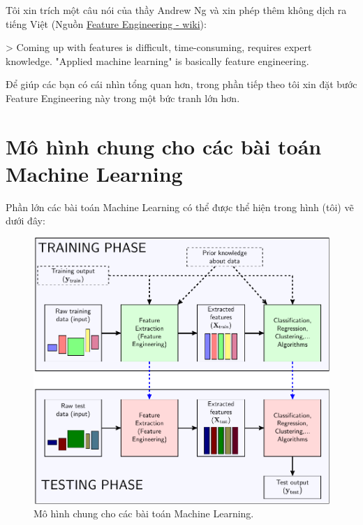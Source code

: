 Tôi xin trích một câu nói của thầy Andrew Ng và xin phép thêm không dịch ra tiếng Việt (Nguồn \href{https://en.wikipedia.org/wiki/Feature_engineering}{Feature Engineering - wiki}): 
 
> Coming up with features is difficult, time-consuming, requires expert knowledge. "Applied machine learning" is basically feature engineering. 
 
Để giúp các bạn có cái nhìn tổng quan hơn, trong phần tiếp theo tôi xin đặt bước Feature Engineering này trong một bức tranh lớn hơn. 
 
 
\section{Mô hình chung cho các bài toán Machine Learning }
Phần lớn các bài toán Machine Learning có thể được thể hiện trong hình (tôi) vẽ dưới đây: 
 

 \begin{figure}
   \centering
   \includegraphics[width = \textwidth]{../FeatureEngineering/latex/ML_models.pdf}
   \caption{Mô hình chung cho các bài toán Machine Learning.}
   \label{fig:}
 \end{figure}
 
